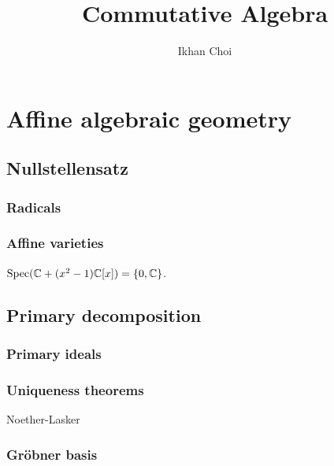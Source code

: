 \documentclass{../../large}
\begin{document}
\title{Commutative Algebra}
\author{Ikhan Choi}
\maketitle
\tableofcontents

\part{Affine algebraic geometry}
\chapter{Nullstellensatz}

\section{Radicals}

\section{Affine varieties}
\begin{prb}
\end{prb}
\begin{prb}
\end{prb}


$\operatorname{Spec}(\mathbb{C}+(x^2-1)\mathbb{C}[x])=\{0,\mathbb{C}\}$.




\chapter{Primary decomposition}

\section{Primary ideals}

\section{Uniqueness theorems}
Noether-Lasker

\section{Gr\"obner basis}

\begin{prb}
\end{prb}
\end{document}
